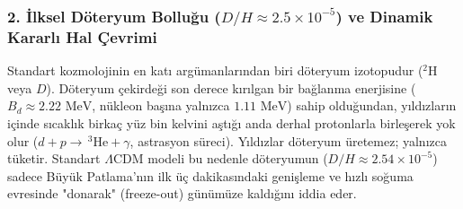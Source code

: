 \subsubsection{2. İlksel Döteryum Bolluğu (\texorpdfstring{$D/H \approx 2.5 \times 10^{-5}$}{D/H ~ 2.5e-5}) ve Dinamik Kararlı Hal Çevrimi}
\label{sec:doteryum_dengesi}
Standart kozmolojinin en katı argümanlarından biri döteryum izotopudur ($^2\mathrm{H}$ veya $D$). Döteryum çekirdeği son derece kırılgan bir bağlanma enerjisine ($B_d \approx 2.22\text{ MeV}$, nükleon başına yalnızca $1.11\text{ MeV}$) sahip olduğundan, yıldızların içinde sıcaklık birkaç yüz bin kelvini aştığı anda derhal protonlarla birleşerek yok olur ($d + p \to \, ^3\mathrm{He} + \gamma$, astrasyon süreci). Yıldızlar döteryum üretemez; yalnızca tüketir. Standart $\Lambda$CDM modeli bu nedenle döteryumun ($D/H \approx 2.54 \times 10^{-5}$) sadece Büyük Patlama'nın ilk üç dakikasındaki genişleme ve hızlı soğuma evresinde "donarak" (freeze-out) günümüze kaldığını iddia eder.


